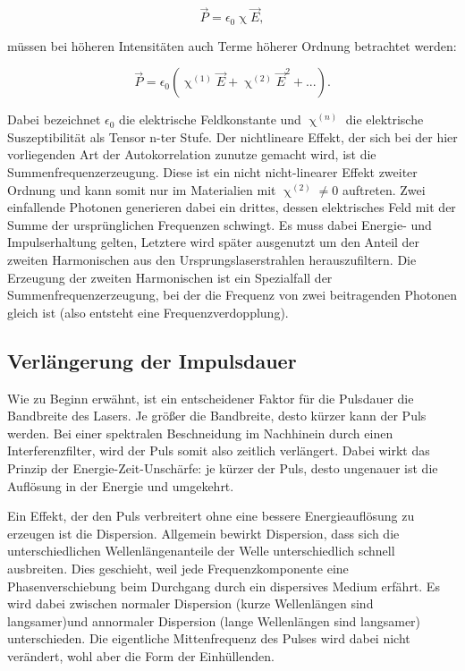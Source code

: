 \begin{equation}
    \vec P = \epsilon_0 \upchi \vec E,
\end{equation}

müssen bei höheren Intensitäten auch Terme höherer Ordnung betrachtet werden:

\begin{equation}
    \vec P = \epsilon_0 (\upchi ^{(1)}\vec E+\upchi ^{(2)}\vec E^2 +...).
\end{equation}

Dabei bezeichnet $\epsilon_0$ die elektrische Feldkonstante und $\upchi ^ {(n)}$ die elektrische Suszeptibilität als Tensor n-ter Stufe.
Der nichtlineare Effekt, der sich bei der hier vorliegenden Art der Autokorrelation zunutze gemacht wird,
ist die Summenfrequenzerzeugung. Diese ist ein nicht nicht-linearer Effekt zweiter Ordnung und kann somit nur im Materialien mit $\upchi ^ {(2)}\neq 0$ auftreten.
Zwei einfallende Photonen generieren dabei ein drittes, dessen elektrisches Feld mit der 
Summe der ursprünglichen Frequenzen schwingt. 
Es muss dabei Energie- und Impulserhaltung gelten, Letztere wird später ausgenutzt um den Anteil der zweiten Harmonischen aus den Ursprungslaserstrahlen herauszufiltern.
Die Erzeugung der zweiten Harmonischen ist ein Spezialfall der Summenfrequenzerzeugung, bei der die Frequenz von zwei beitragenden Photonen gleich ist (also entsteht eine Frequenzverdopplung).



\subsection{Verlängerung der Impulsdauer}
Wie zu Beginn erwähnt, ist ein entscheidener Faktor für die Pulsdauer die Bandbreite des Lasers.
Je größer die Bandbreite, desto kürzer kann der Puls werden.
Bei einer spektralen Beschneidung im Nachhinein durch einen Interferenzfilter, wird
der Puls somit also zeitlich verlängert. Dabei wirkt das Prinzip der Energie-Zeit-Unschärfe:
je kürzer der Puls, desto ungenauer ist die Auflösung in der Energie und umgekehrt.

Ein Effekt, der den Puls verbreitert ohne eine bessere Energieauflösung zu erzeugen ist die Dispersion.
Allgemein bewirkt Dispersion, dass sich die unterschiedlichen Wellenlängenanteile der Welle unterschiedlich schnell ausbreiten.
Dies geschieht, weil jede Frequenzkomponente eine Phasenverschiebung beim Durchgang
durch ein dispersives Medium erfährt.
Es wird dabei zwischen normaler Dispersion (kurze Wellenlängen sind langsamer)und annormaler Dispersion (lange Wellenlängen sind langsamer) unterschieden.
Die eigentliche Mittenfrequenz des Pulses wird dabei nicht verändert, wohl aber die Form der Einhüllenden.

